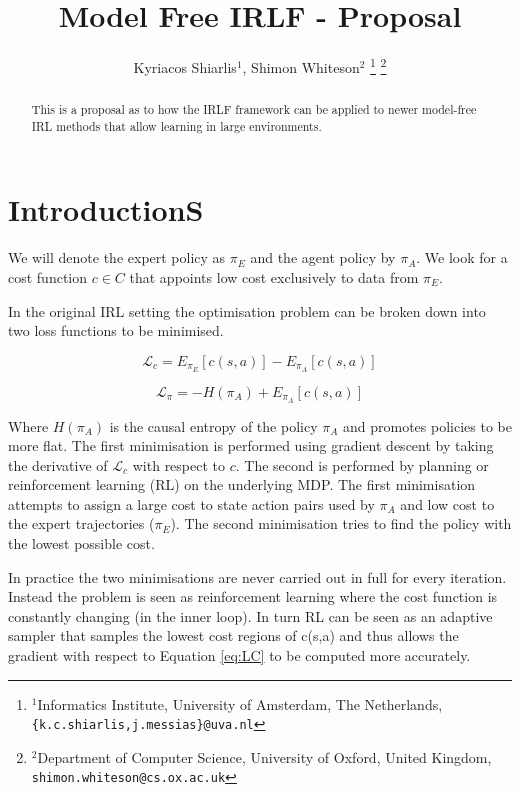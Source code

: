\documentclass[letterpaper, 10 pt, conference]{ieeeconf}
\title{\LARGE \bf
Model Free IRLF - Proposal
}
\author{Kyriacos Shiarlis$^{1}$, Shimon Whiteson$^{2}$%
\thanks{$^{1}$Informatics Institute, University of Amsterdam, The Netherlands,
         {\tt\small \{k.c.shiarlis,j.messias\}@uva.nl}}%
\thanks{$^{2}$Department of Computer Science, University of Oxford, United Kingdom,
         {\tt\small shimon.whiteson@cs.ox.ac.uk}}%
}
\begin{document}
\maketitle

\thispagestyle{empty}
\pagestyle{empty}


\begin{abstract}
This is a proposal as to how the IRLF framework can be applied to newer model-free IRL methods that allow learning in large environments.
\end{abstract}

\section{IntroductionS}
We will denote the expert policy as $\pi_E$ and the agent policy by $\pi_A$. We look for a cost function $c \in C$ that appoints low cost exclusively to data from $\pi_E$. 

In the original IRL setting the optimisation problem can be broken down into two loss functions to be minimised.

\begin{equation}
\mathcal{L}_c = E_{\pi_E}[c(s,a)] - E_{\pi_A}[c(s,a)] \label{eq:LC}
\end{equation}


\begin{equation}
 \mathcal{L}_{\pi} = -H(\pi_A) + E_{\pi_A}[c(s,a)] \label{eq:LP}
\end{equation}

Where $H(\pi_A)$ is the causal entropy of the policy $\pi_A$ and promotes policies to be more flat. 
The first minimisation is performed using gradient descent by taking the derivative of $\mathcal{L}_c$ with respect to $c$. The second is performed by planning or reinforcement learning (RL) on the underlying MDP. The first minimisation attempts to assign a large cost to state action pairs used by $\pi_A$ and low cost to the expert trajectories ($\pi_E$). The second minimisation tries to find the policy with the lowest possible cost. 

In practice the two minimisations are never carried out in full for every iteration. Instead the problem is seen as reinforcement learning where the cost function is constantly changing (in the inner loop). In turn RL can be seen as an adaptive sampler that samples the lowest cost regions of c(s,a) and thus allows the gradient with respect to Equation \ref{eq:LC}  to be computed more accurately. 
\end{document}
